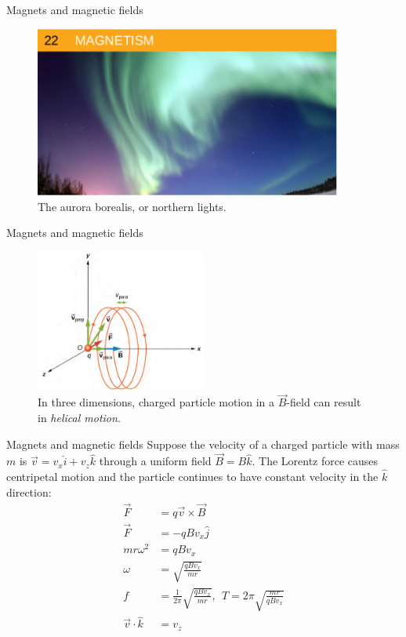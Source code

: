 \documentclass{beamer}
\begin{document}
\begin{frame}{Magnets and magnetic fields}
\begin{figure}
\centering
\includegraphics[width=0.9\textwidth]{figures/aurora.png}
\caption{\label{fig:aurora} The aurora borealis, or northern lights.}
\end{figure}
\end{frame}

\begin{frame}{Magnets and magnetic fields}
\begin{figure}
\centering
\includegraphics[width=0.5\textwidth]{figures/helix.png}
\caption{\label{fig:helix} In three dimensions, charged particle motion in a $\vec{B}$-field can result in \textit{helical motion}.}
\end{figure}
\end{frame}

\begin{frame}{Magnets and magnetic fields}
Suppose the velocity of a charged particle with mass $m$ is $\vec{v} = v_x \hat{i} + v_z \hat{k}$ through a uniform field $\vec{B} = B\hat{k}$.  The Lorentz force causes centripetal motion and the particle continues to have constant velocity in the $\hat{k}$ direction:
\begin{align}
\vec{F} &= q \vec{v} \times \vec{B} \\
\vec{F} &= -q B v_x \hat{j} \\
m r \omega^2 &= q B v_x \\
\omega &= \sqrt{\frac{qBv_x}{m r}} \\
f &= \frac{1}{2\pi}\sqrt{\frac{qBv_x}{m r}}, ~~ T = 2\pi \sqrt{\frac{m r}{q B v_x}} \\
\vec{v} \cdot \hat{k} &= v_z
\end{align}
\end{frame}
\end{document}
